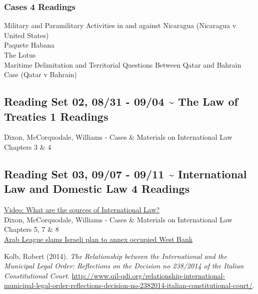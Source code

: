 \documentclass[10pt,]{article}
\begin{document}
\hypertarget{cases-4-readings}{%
\subsubsection{Cases \textbar{} 4 Readings}\label{cases-4-readings}}

Military and Paramilitary Activities in and against Nicaragua (Nicaragua
v United States)\\
Paquete Habana\\
The Lotus\\
Maritime Delimitation and Territorial Questions Between Qatar and
Bahrain Case (Qatar v Bahrain)

\hypertarget{reading-set-02-0831---0904-the-law-of-treaties-1-readings}{%
\subsection{Reading Set 02, 08/31 - 09/04 \textasciitilde{} The Law of
Treaties \textbar{} 1
Readings}\label{reading-set-02-0831---0904-the-law-of-treaties-1-readings}}

Dixon, McCorquodale, Williams - Cases \& Materials on International Law
Chapters 3 \& 4

\hypertarget{reading-set-03-0907---0911-international-law-and-domestic-law-4-readings}{%
\subsection{Reading Set 03, 09/07 - 09/11 \textasciitilde{}
International Law and Domestic Law \textbar{} 4
Readings}\label{reading-set-03-0907---0911-international-law-and-domestic-law-4-readings}}

\href{https://www.youtube.com/watch?v=0ViSYjt-wGw}{Video: What are the
sources of International Law?}\\
Dixon, McCorquodale, Williams - Cases \& Materials on International Law
Chapters 5, 7 \& 8\\
\href{https://www.aljazeera.com/news/2020/04/arab-league-slams-israeli-plan-annex-occupied-west-bank-200430145602846.html}{Arab
League slams Israeli plan to annex occupied West Bank}

Kolb, Robert (2014).
\emph{The Relationship between the International and the Municipal Legal Order: Reflections on the Decision no 238/2014 of the Italian Constitutional Court}.
\url{http://www.qil-qdi.org/relationship-international-municipal-legal-order-reflections-decision-no-2382014-italian-constitutional-court/}.
\end{document}
